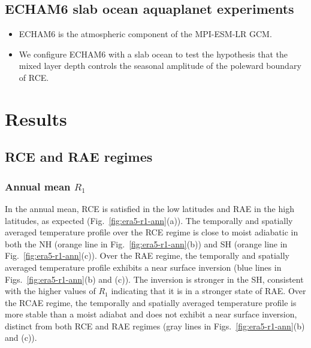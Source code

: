 \documentclass{ametsocV5}
\begin{document}
\subsection{ECHAM6 slab ocean aquaplanet experiments}
\begin{itemize}
  \item ECHAM6 is the atmospheric component of the MPI-ESM-LR GCM.
  \item We configure ECHAM6 with a slab ocean to test the hypothesis that the mixed layer depth controls the seasonal amplitude of the poleward boundary of RCE.
\end{itemize}


\section{Results} \label{sec:results}

\subsection{RCE and RAE regimes}
    \subsubsection{Annual mean $R_1$}
    In the annual mean, RCE is satisfied in the low latitudes and RAE in the high latitudes, as expected (Fig.~\ref{fig:era5-r1-ann}(a)). The temporally and spatially averaged temperature profile over the RCE regime is close to moist adiabatic in both the NH (orange line in Fig.~\ref{fig:era5-r1-ann}(b)) and SH (orange line in Fig.~\ref{fig:era5-r1-ann}(c)). Over the RAE regime, the temporally and spatially averaged temperature profile exhibits a near surface inversion (blue lines in Figs.~\ref{fig:era5-r1-ann}(b) and (c)). The inversion is stronger in the SH, consistent with the higher values of $R_{1}$ indicating that it is in a stronger state of RAE. Over the RCAE regime, the temporally and spatially averaged temperature profile is more stable than a moist adiabat and does not exhibit a near surface inversion, distinct from both RCE and RAE regimes (gray lines in Figs.~\ref{fig:era5-r1-ann}(b) and (c)).
    
\end{document}
